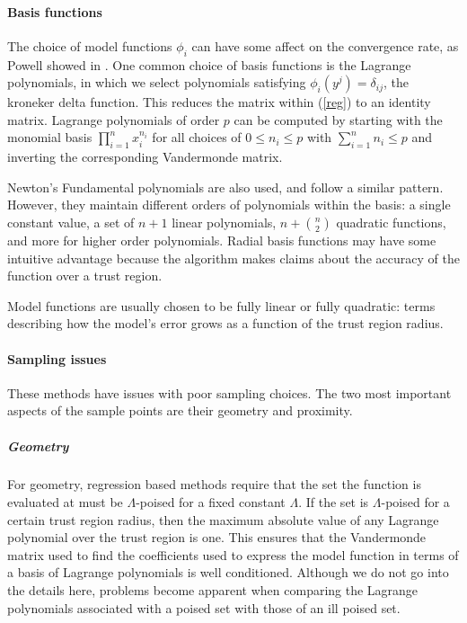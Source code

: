 \documentclass{article}
\let\oldref\ref
\renewcommand{\ref}[1]{(\oldref{#1})}
\begin{document}
\paragraph{Basis functions}

The choice of model functions $\phi_i$ can have some affect on the convergence rate, as Powell showed in \cite{DUMMY:PowellRadialBasis}.
One common choice of basis functions is the Lagrange polynomials, in which we select polynomials satisfying $\phi_{i}(y^j) = \delta_{ij}$, the kroneker delta function.
This reduces the matrix within \ref{reg} to an identity matrix.
Lagrange polynomials of order $p$ can be computed by starting with the monomial basis $\prod_{i=1}^{n} x_i^{n_i}$ for all choices of $0 \le n_i \le p$ with $\sum_{i=1}^n n_i \le p$ and inverting the corresponding Vandermonde matrix.

Newton's Fundamental polynomials are also used, and follow a similar pattern.
However, they maintain different orders of polynomials within the basis:
a single constant value, a set of $n+1$ linear polynomials,
$n + {n \choose 2}$ quadratic functions, and more for higher order polynomials.
Radial basis functions may have some intuitive advantage because the algorithm makes claims about the accuracy of the function over a trust region.


Model functions are usually chosen to be fully linear or fully quadratic: terms describing how the model's error grows as a function of the trust region radius.

\paragraph{Sampling issues}

These methods have issues with poor sampling choices.
The two most important aspects of the sample points are their geometry and proximity.

\subparagraph{Geometry}

For geometry, regression based methods require that the set the function is evaluated at must be $\Lambda$-poised for a fixed constant $\Lambda$.
If the set is $\Lambda$-poised for a certain trust region radius, then the maximum absolute value of any Lagrange polynomial over the trust region is one.
This ensures that the Vandermonde matrix used to find the coefficients used to express the model function in terms of a basis of Lagrange polynomials is well conditioned.
Although we do not go into the details here, problems become apparent when comparing the Lagrange polynomials associated with a poised set with those of an ill poised set.
\end{document}
